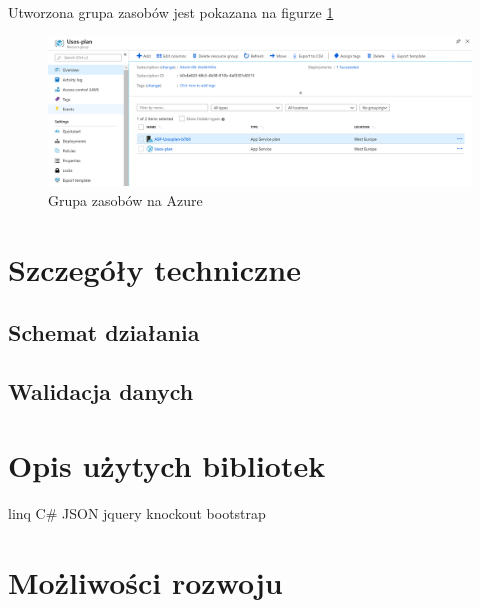 \documentclass{mwart}
\begin{document}
Utworzona grupa zasobów jest pokazana na figurze \ref{fig:resourceGroup}

\begin{figure}[h]
    \centering
    \includegraphics[width=13cm]{resource_group.png}
    \caption{Grupa zasobów na Azure}
    \label{fig:resourceGroup}
\end{figure}

\section{Szczegóły techniczne}

\subsection{Schemat działania}

\subsection{Walidacja danych}

\section{Opis użytych bibliotek}
linq
C\# JSON
jquery
knockout
bootstrap

\section{Możliwości rozwoju}
\end{document}
